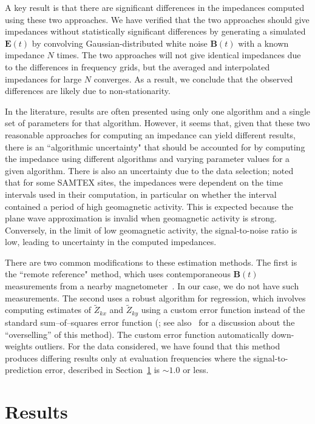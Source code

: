 \documentclass[pdflatex,sn-basic]{sn-jnl}%
\begin{document}
A key result is that there are significant differences in the impedances computed using these two approaches. We have verified that the two approaches should give impedances without statistically significant differences by generating a simulated $\mathbf{E}(t)$ by convolving Gaussian-distributed white noise $\mathbf{B}(t)$ with a known impedance $N$ times. The two approaches will not give identical impedances due to the differences in frequency grids, but the averaged and interpolated impedances for large $N$ converges. As a result, we conclude that the observed differences are likely due to non-stationarity.

In the literature, results are often presented using only one algorithm and a single set of parameters for that algorithm. However, it seems that, given that these two reasonable approaches for computing an impedance can yield different results, there is an ``algorithmic uncertainty" that should be accounted for by computing the impedance using different algorithms and varying parameter values for a given algorithm. There is also an uncertainty due to the data selection; \cite{Chen2022} noted that for some SAMTEX sites, the impedances were dependent on the time intervals used in their computation, in particular on whether the interval contained a period of high geomagnetic activity. This is expected because the plane wave approximation is invalid when geomagnetic activity is strong. Conversely, in the limit of low geomagnetic activity, the signal-to-noise ratio is low, leading to uncertainty in the computed impedances.

There are two common modifications to these estimation methods. The first is the ``remote reference"  method, which uses contemporaneous $\mathbf{B}(t)$ measurements from a nearby magnetometer~\citep{Simpson2005}. In our case, we do not have such measurements. The second uses a robust algorithm for regression, which involves computing estimates of $\widetilde{Z}_{kx}$ and $\widetilde{Z}_{ky}$ using a custom error function instead of the standard sum--of--squares error function (\cite{Simpson2005}; see also~\cite{Thomson2016} for a discussion about the ``overselling'' of this method). The custom error function automatically down-weights outliers. For the data considered, we have found that this method produces differing results only at evaluation frequencies where the signal-to-prediction error, described in Section~\ref{section:Results} is ${\sim}1.0$ or less.

\section{Results}
\label{section:Results}
\end{document}
